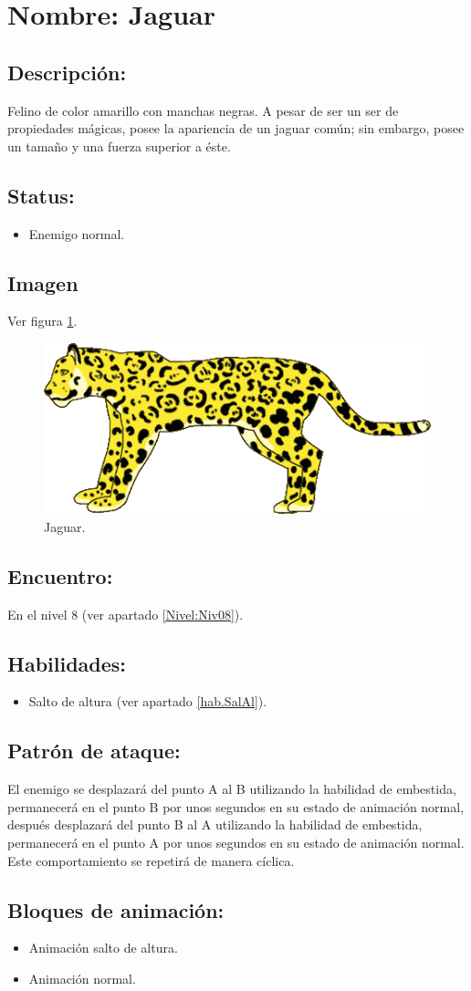 \section{Nombre: Jaguar}   \label{per:jaguar}
\subsection{Descripción:}
Felino de color amarillo con manchas negras. A pesar de ser un ser de propiedades mágicas, posee la apariencia de un jaguar común; sin embargo, posee un tamaño y una fuerza superior a éste.
\subsection{Status:}
\begin{itemize}
	\item Enemigo normal.
\end{itemize}
\subsection{Imagen}
Ver figura \ref{fig:jaguar}.
\begin{figure}
	\centering
	\includegraphics[height=0.2 \textheight]{Imagenes/jaguar}
	\caption{Jaguar.}
	\label{fig:jaguar}
\end{figure}
\subsection{Encuentro:}
En el nivel 8 (ver apartado \ref{Nivel:Niv08}).
\subsection{Habilidades:}
\begin{itemize}
	\item Salto de altura (ver apartado \ref{hab.SalAl}).
\end{itemize}
\subsection{Patrón de ataque:}
El enemigo se desplazará del punto A al B utilizando la habilidad de embestida, permanecerá en el punto B por unos segundos en su estado de animación normal, después desplazará del punto B al A utilizando la habilidad de embestida, permanecerá en el punto A por unos segundos en su estado de animación normal. Este comportamiento se repetirá de manera cíclica.
\subsection{Bloques de animación:}
	\begin{itemize}
		\item Animación salto de altura.
		\item Animación normal.
	\end{itemize}